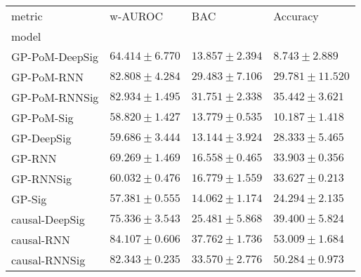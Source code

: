 \begin{tabular}{llll}
\toprule
metric &                                        w-AUROC &                                            BAC &                                       Accuracy \\
model          &                                                &                                                &                                                \\
\midrule
GP-PoM-DeepSig &                           $ 64.414 \pm 6.770 $ &                           $ 13.857 \pm 2.394 $ &                            $ 8.743 \pm 2.889 $ \\
GP-PoM-RNN     &                           $ 82.808 \pm 4.284 $ &                           $ 29.483 \pm 7.106 $ &                          $ 29.781 \pm 11.520 $ \\
GP-PoM-RNNSig  &                           $ 82.934 \pm 1.495 $ &                           $ 31.751 \pm 2.338 $ &                           $ 35.442 \pm 3.621 $ \\
GP-PoM-Sig     &                           $ 58.820 \pm 1.427 $ &                           $ 13.779 \pm 0.535 $ &                           $ 10.187 \pm 1.418 $ \\
\midrule
GP-DeepSig     &                           $ 59.686 \pm 3.444 $ &                           $ 13.144 \pm 3.924 $ &                           $ 28.333 \pm 5.465 $ \\
GP-RNN         &                           $ 69.269 \pm 1.469 $ &                           $ 16.558 \pm 0.465 $ &                           $ 33.903 \pm 0.356 $ \\
GP-RNNSig      &                           $ 60.032 \pm 0.476 $ &                           $ 16.779 \pm 1.559 $ &                           $ 33.627 \pm 0.213 $ \\
GP-Sig         &                           $ 57.381 \pm 0.555 $ &                           $ 14.062 \pm 1.174 $ &                           $ 24.294 \pm 2.135 $ \\
\midrule
causal-DeepSig &                           $ 75.336 \pm 3.543 $ &                           $ 25.481 \pm 5.868 $ &                           $ 39.400 \pm 5.824 $ \\
causal-RNN     &                           $ 84.107 \pm 0.606 $ &                           $ 37.762 \pm 1.736 $ &                           $ 53.009 \pm 1.684 $ \\
causal-RNNSig  &                           $ 82.343 \pm 0.235 $ &                           $ 33.570 \pm 2.776 $ &                           $ 50.284 \pm 0.973 $ \\

\end{tabular}
